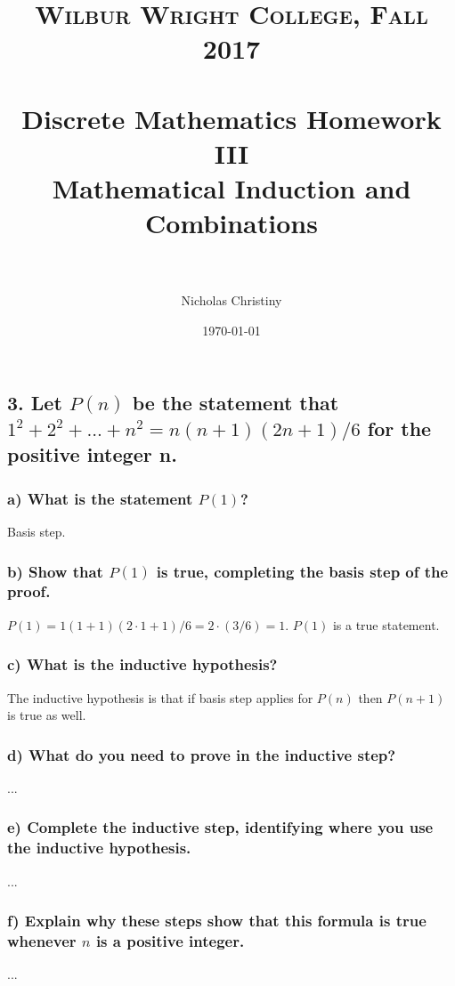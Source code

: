 \documentclass[11pt, oneside]{article} %
\title{
\normalfont \normalsize
\textsc{Wilbur Wright College, Fall 2017} \\ [25pt] %
\horrule{0.5pt} \\[0.4cm] %
\huge Discrete Mathematics Homework III \\
\huge Mathematical Induction and Combinations \\ %
\horrule{2pt} \\[0.5cm] %
}
\author{Nicholas Christiny} %
\date{\normalsize\today} %
\numberwithin{equation}{section} %
\numberwithin{figure}{section} %
\numberwithin{table}{section} %
\begin{document}
\maketitle %


\section{}
\subsection{3. Let $P(n)$ be the statement that $1^2 + 2^2 +...+n^2 = n(n + 1)(2n + 1)/6$ for the positive integer n.}
\subsubsection{a) What is the statement $P(1)$?}
Basis step. 
\subsubsection{b) Show that $P(1)$ is true, completing the basis step of the proof.}
$P(1)=1(1+1)(2\cdot 1+1)/6 = 2\cdot (3/6)  = 1$. $P(1)$ is a true statement.
\subsubsection{c) What is the inductive hypothesis?}
The inductive hypothesis is that if basis step applies for $P(n)$ then $P(n+1)$ is true as well.
\subsubsection{d) What do you need to prove in the inductive step?}
...

\subsubsection{e) Complete the inductive step, identifying where you use the inductive hypothesis.}
...

\subsubsection{f) Explain why these steps show that this formula is true whenever $n$ is a positive integer.}
...
\end{document}
